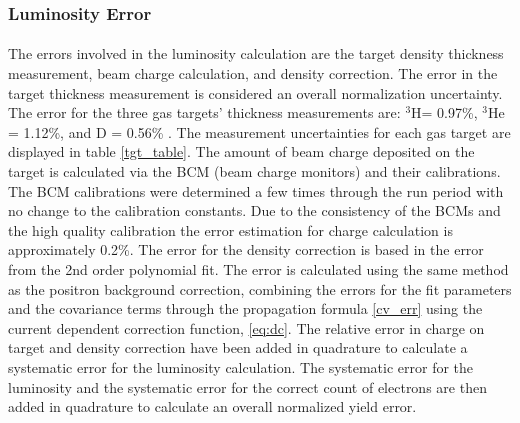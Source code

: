 \subsubsection{Luminosity Error}
\paragraph{}The errors involved in the luminosity calculation are the target density thickness measurement, beam charge calculation, and density correction. The error in the target thickness measurement is considered an overall normalization uncertainty. The error for the three gas targets' thickness measurements are: $^3$H= 0.97\%, $^3$He = 1.12\%, and D = 0.56\% \cite{HATT_eng}. The measurement uncertainties for each gas target are displayed in table \ref{tgt_table}. The amount of beam charge deposited on the target is calculated via the BCM (beam charge monitors) and their calibrations. The BCM calibrations were determined a few times through the run period with no change to the calibration constants. Due to the consistency of the BCMs and the high quality calibration the  error estimation for charge calculation is approximately 0.2\%. The error for the density correction is based in the error from the 2nd order polynomial fit. The error is calculated using the same method as the positron background correction, combining the errors for the fit parameters and the covariance terms through the propagation formula \ref{cv_err} using the current dependent correction function, \ref{eq:dc}. The relative error in charge on target and density correction have been added in quadrature to calculate a systematic error for the luminosity calculation. The systematic error for the luminosity and the systematic error for the correct count of electrons are then added in quadrature to calculate an overall normalized yield error.  
